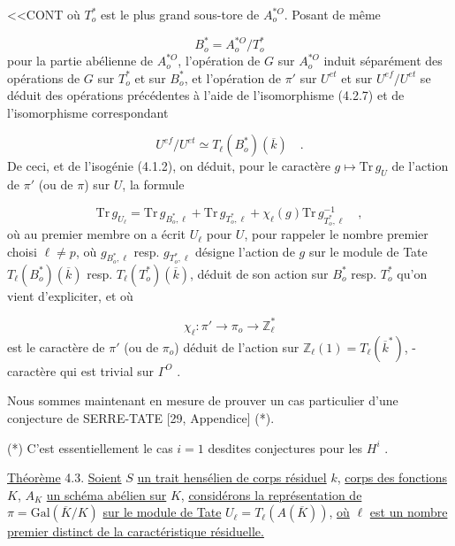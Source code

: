 
<<CONT où $T^{*}_{o}$ est le plus grand sous-tore de $A^{*O}_{o}$. Posant de même

\begin{equation}\tag{4.2.8}
B^{*}_{o} = A^{*O}_{o}/T^{*}_{o}
\end{equation}
pour la partie abélienne de $A^{*O}_{o}$, l'opération de $G$ sur $A^{*O}_{o}$ induit séparément des opérations de $G$ sur $T^{*}_{o}$ et sur $B^{*}_{o}$, et l'opération de $\pi'$ sur $U^{et}$ et sur $U^{ef}/U^{et}$ se déduit des opérations précédentes à l'aide de l'isomorphisme (4.2.7) et de l'isomorphisme correspondant

\begin{equation}\tag{4.2.9}
U^{ef}/U^{et} \simeq T_{\ell}(B^{*}_{o})(\overline{k}) \quad .
\end{equation}
De ceci, et de l'isogénie (4.1.2), on déduit, pour le caractère $g \longmapsto \mathrm{Tr}\, g_{U}$ de l'action de $\pi'$ (ou de $\pi$) sur $U$, la formule

\begin{equation}\tag{4.2.10}
\mathrm{Tr}\, g_{U_{\ell}} = \mathrm{Tr}\, g_{B^{*}_{o},\ell} + \mathrm{Tr}\, g_{T^{*}_{o},\ell} + \chi_{\ell}(g)\mathrm{Tr}\, g^{-1}_{T^{*}_{o},\ell} \quad ,
\end{equation}
où au premier membre on a écrit $U_{\ell}$ pour $U$, pour rappeler le nombre premier choisi $\ell \neq p$, où $g_{B^{*}_{o},\ell}$ resp. $g_{T^{*}_{o},\ell}$ désigne l'action de $g$ sur le module de Tate $T_{\ell}(B^{*}_{o})(\overline{k})$ resp. $T_{\ell}(T^{*}_{o})(\overline{k})$, déduit de son action sur $B^{*}_{o}$ resp. $T^{*}_{o}$ qu'on vient d'expliciter, et où

\begin{equation}\tag{4.2.11}
\chi_{\ell} : \pi' \longrightarrow \pi_{o} \longrightarrow \mathbb{Z}^{*}_{\ell}
\end{equation}
est le caractère de $\pi'$ (ou de $\pi_{o}$) déduit de l'action sur $\mathbb{Z}_{\ell}(1) = T_{\ell}(\overline{k}^{*})$, - caractère qui est trivial sur $\Gamma^{O}$ .

Nous sommes maintenant en mesure de prouver un cas particulier d'une conjecture de SERRE-TATE [29, Appendice] (*).

(*) C'est essentiellement le cas $i=1$ desdites conjectures pour les $H^{i}$ .



\underline{Théorème} 4.3. \underline{Soient} $S$ \underline{un trait hensélien de corps résiduel} $k$, \underline{corps des fonctions} $K$, $A_K$ \underline{un schéma abélien sur} $K$, \underline{considérons la représentation de} $\pi = \mathrm{Gal}(\overline{K}/K)$ \underline{sur le module de Tate} $U_\ell = T_\ell(A(\overline{K}))$, \underline{où} $\ell$ \underline{est un nombre premier distinct de la caractéristique résiduelle.}

